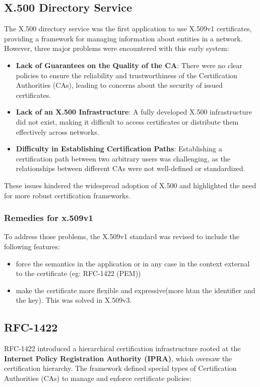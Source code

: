 \subsection{X.500 Directory Service}

The X.500 directory service was the first application to use X.509v1
certificates, providing a framework for managing information about
entities in a network. However, three major problems were encountered
with this early system:

\begin{itemize}
  \item \textbf{Lack of Guarantees on the Quality of the CA}: There were
    no clear policies to ensure the reliability and trustworthiness
    of the Certification Authorities (CAs), leading to concerns
    about the security of issued certificates.

  \item \textbf{Lack of an X.500 Infrastructure}: A fully developed X.500
    infrastructure did not exist, making it difficult to access
    certificates or distribute them effectively across networks.

  \item \textbf{Difficulty in Establishing Certification Paths}:
    Establishing a certification path between two arbitrary users
    was challenging, as the relationships between different CAs were
    not well-defined or standardized.
\end{itemize}

These issues hindered the widespread adoption of X.500 and highlighted
the need for more robust certification frameworks.
\subsubsection{Remedies for x.509v1}
To address those problems, the X.509v1 standard was revised to include 
the following features:
\begin{itemize}
  \item force the semantics in the application or in any case in the
    context external to the certificate (eg: RFC-1422 (PEM))
  \item make the certificate more flexible and expressive(more htan the
    identifier and the key). This was solved in X.509v3.
\end{itemize}

\subsection{RFC-1422}
RFC-1422 introduced a hierarchical certification infrastructure rooted
at the \textbf{Internet Policy Registration Authority (IPRA)}, which
oversaw the certification hierarchy. The framework defined special
types of Certification Authorities (CAs) to manage and enforce
certificate policies:

